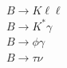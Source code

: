 \documentclass[preprint,3p,12pt]{elsarticle}
\begin{document}
{%

\textbf{$B\to K\ell \ell$}\\

\textbf{$B \to K^{*} \gamma$}\\

\textbf{$B\to \phi \gamma$}\\
%    

\textbf{$B\to \tau \nu$}\\


}
\end{document}
